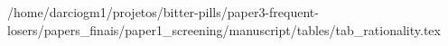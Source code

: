 /home/darciogm1/projetos/bitter-pills/paper3-frequent-losers/papers_finais/paper1_screening/manuscript/tables/tab_rationality.tex